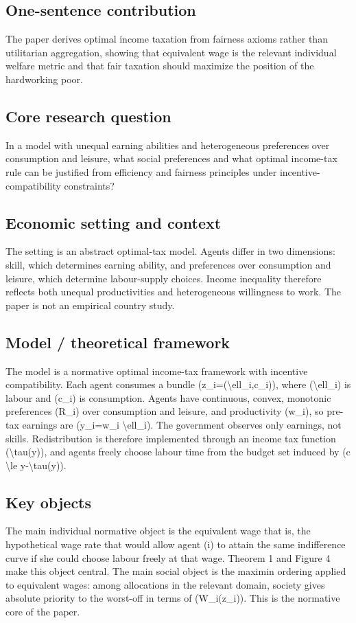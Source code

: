 \documentclass[11pt,a4paper]{article}
\begin{document}
\subsection*{One-sentence contribution}
The paper derives optimal income taxation from fairness axioms rather than utilitarian aggregation, showing that equivalent wage is the relevant individual welfare metric and that fair taxation should maximize the position of the hardworking poor.

\subsection*{Core research question}
In a model with unequal earning abilities and heterogeneous preferences over consumption and leisure, what social preferences and what optimal income-tax rule can be justified from efficiency and fairness principles under incentive-compatibility constraints?

\subsection*{Economic setting and context}
The setting is an abstract optimal-tax model. Agents differ in two dimensions: skill, which determines earning ability, and preferences over consumption and leisure, which determine labour-supply choices. Income inequality therefore reflects both unequal productivities and heterogeneous willingness to work. The paper is not an empirical country study.

\subsection*{Model / theoretical framework}
The model is a normative optimal income-tax framework with incentive compatibility. Each agent consumes a bundle (z\_i=(\textbackslash{}ell\_i,c\_i)), where (\textbackslash{}ell\_i) is labour and (c\_i) is consumption. Agents have continuous, convex, monotonic preferences (R\_i) over consumption and leisure, and productivity (w\_i), so pre-tax earnings are (y\_i=w\_i \textbackslash{}ell\_i). The government observes only earnings, not skills. Redistribution is therefore implemented through an income tax function (\textbackslash{}tau(y)), and agents freely choose labour time from the budget set induced by (c \textbackslash{}le y-\textbackslash{}tau(y)).

\subsection*{Key objects}
The main individual normative object is the equivalent wage that is, the hypothetical wage rate that would allow agent (i) to attain the same indifference curve if she could choose labour freely at that wage. Theorem 1 and Figure 4 make this object central. The main social object is the maximin ordering applied to equivalent wages: among allocations in the relevant domain, society gives absolute priority to the worst-off in terms of (W\_i(z\_i)). This is the normative core of the paper.
\end{document}
